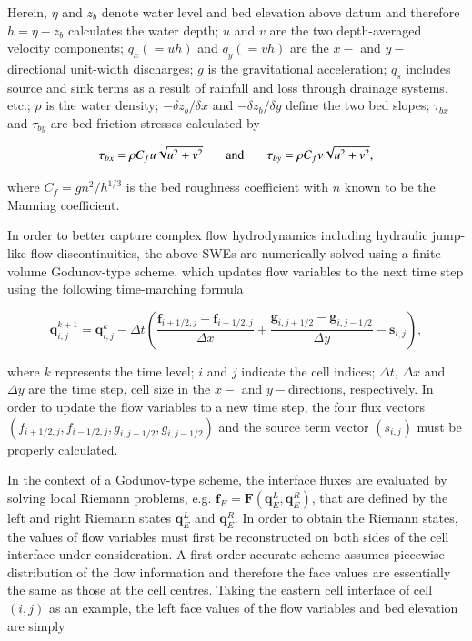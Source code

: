 \documentclass[11pt,english,a4paper]{article}
\begin{document}
Herein, $\eta$ and $z_b$ denote water level and bed elevation above datum and therefore $h = \eta - z_b$ calculates the water depth; $u$ and $v$ are the two depth-averaged velocity components; $q_x (= uh)$ and $q_y (= vh)$ are the $x-$ and $y-$directional unit-width discharges; $g$ is the gravitational acceleration; $q_s$ includes source and sink terms as a result of rainfall and loss through drainage systems, etc.;  $\rho$ is the water density; $-\delta z_b / \delta x$ and $-\delta z_b / \delta y$ define the two bed slopes; $\tau _{bx}$ and $\tau _{by}$ are bed friction stresses calculated by

\begin{equation}
	\label{SWE_1stO_BedFriction}
	\tau _{bx} = \rho C_f u\sqrt{u^2 + v^2} 
	\hspace{4ex} \textrm{and} \hspace{4ex}
	\tau _{by} = \rho C_f v\sqrt{u^2 + v^2} 
	,
\end{equation}

where $C_f = gn^2 / h^{1/3}$ is the bed roughness coefficient with $n$ known to be the Manning coefficient.

In order to better capture complex flow hydrodynamics including hydraulic jump-like flow discontinuities, the above SWEs are numerically solved using a finite-volume Godunov-type scheme, which updates flow variables to the next time step using the following time-marching formula

\begin{equation}
	\label{SWE_1stO_Update}
	\textbf{q}_{i,j}^{k+1} 
	=
	\textbf{q}_{i,j}^{k}
	- \Delta t
	\left (
		\frac{\textbf{f}_{i+1/2, j} - \textbf{f}_{i-1/2, j}}{\Delta x}
		+
		\frac{\textbf{g}_{i, j+1/2} - \textbf{g}_{i, j-1/2}}{\Delta y}
		-
		\textbf{s}_{i,j}
	\right )
	,
\end{equation}

where $k$ represents the time level; $i$ and $j$ indicate the cell indices; $\Delta t$, $\Delta x$ and $\Delta y$ are the time step, cell size in the $x-$ and $y-$directions, respectively. In order to update the flow variables to a new time step, the four flux vectors $(f_{i+1/2, j}, f_{i-1/2, j}, g_{i, j+1/2}, g_{i, j-1/2})$ and the source term vector $(s_{i, j})$ must be properly calculated.

In the context of a Godunov-type scheme, the interface fluxes are evaluated by solving local Riemann problems, e.g. $\textbf{f}_E = \textbf{F}(\textbf{q}_E^L, \textbf{q}_E^R)$, that are defined by the left and right Riemann states $\textbf{q}_E^L$ and $\textbf{q}_E^R$. In order to obtain the Riemann states, the values of flow variables must first be reconstructed on both sides of the cell interface under consideration. A first-order accurate scheme assumes piecewise distribution of the flow information and therefore the face values are essentially the same as those at the cell centres. Taking the eastern cell interface of cell $(i, j)$ as an example, the left face values of the flow variables and bed elevation are simply
\end{document}
